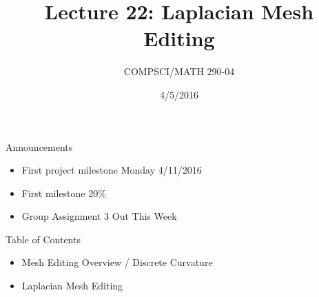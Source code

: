 \documentclass{beamer}
\title{Lecture 22: Laplacian Mesh Editing}
\date{4/5/2016}
\institute{Chris Tralie, Duke University}
\author{COMPSCI/MATH 290-04}
\begin{document}
\frame{\titlepage}

\begin{frame}{Announcements}
\begin{itemize}[label=$\vartriangleright$]

\item First project milestone Monday 4/11/2016

\item First milestone 20\%

\item Group Assignment 3 Out This Week

\end{itemize}

\end{frame}

\begin{frame}{Table of Contents}
\begin{itemize}[label=$\blacktriangleright$]
	\item Mesh Editing Overview / Discrete Curvature
\end{itemize}

\begin{itemize}[label=$\vartriangleright$]
	\item Laplacian Mesh Editing
\end{itemize}
\end{frame}
\end{document}
